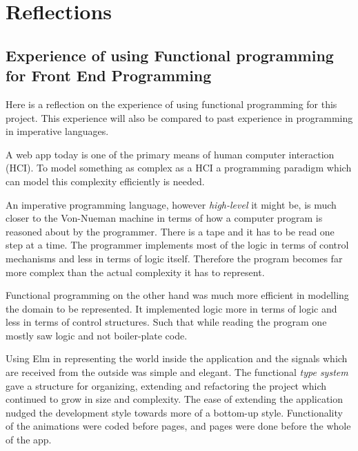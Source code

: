 
\section{Reflections}


\subsection{Experience of using Functional programming for Front End Programming} 

Here is a reflection on the experience of using functional programming for this
project. This experience will also be compared to past experience in
programming in imperative languages.

A web app today is one of the primary means of human computer interaction
(HCI). To model something as complex as a HCI a programming paradigm which can
model this complexity efficiently is needed. 

An imperative programming language, however \emph{high-level} it might be, is
much closer to the Von-Nueman machine in terms of how a computer program is
reasoned about by the programmer. There is a tape and it has to be read one
step at a time. The programmer implements most of the logic in terms of control
mechanisms and less in terms of logic itself. Therefore the program becomes far
more complex than the actual complexity it has to represent. 

Functional programming on the other hand was much more efficient in modelling
the domain to be represented. It implemented logic more in terms of logic and
less in terms of control structures. Such that while reading the program one
mostly saw logic and not boiler-plate code.

Using Elm in representing the world inside the application and the signals
which are received from the outside was simple and elegant. The functional
\emph{type system} gave a structure for organizing, extending and refactoring
the project which continued to grow in size and complexity. The ease of
extending the application nudged the development style towards more of a
bottom-up style. Functionality of the animations were coded before pages, and
pages were done before the whole of the app.

